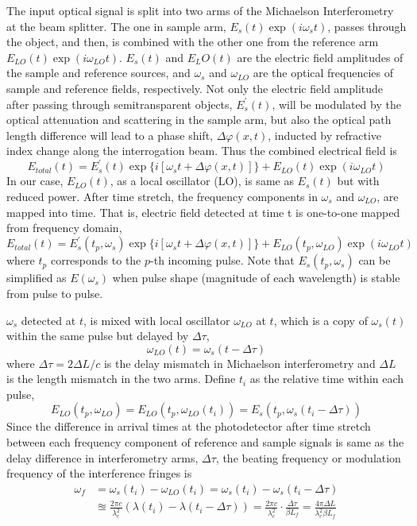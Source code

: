 \documentclass[aps,pra,reprint,superscriptaddress]{revtex4-1}
\begin{document}
The input optical signal is split into two arms of the Michaelson Interferometry at the beam splitter. The one in sample arm, $E_s(t)\exp⁡(i\omega_s t)$, passes through the object, and then, is combined with the other one from the reference arm $E_{LO}(t)\exp⁡(i\omega_{LO} t)$. $E_s(t)$ and $E_LO(t)$ are the electric field amplitudes of the sample and reference sources, and $\omega_s$ and $\omega_{LO}$ are the optical frequencies of sample and reference fields, respectively. Not only the electric field amplitude after passing through semitransparent objects, $E_s^\prime(t)$, will be modulated by the optical attenuation and scattering in the sample arm, but also the optical path length difference will lead to a phase shift, $\Delta\varphi(x,t)$, inducted by refractive index change along the interrogation beam. Thus the combined electrical field is
\begin{equation}
E_{total}(t) = E_s^\prime(t) \exp⁡ \lbrace i[\omega_s t+\Delta\varphi(x,t)] \rbrace + E_{LO}(t) \exp⁡(i\omega_{LO} t)
\end{equation}
In our case, $E_{LO}(t)$, as a local oscillator (LO), is same as $E_s(t)$ but with reduced power. After time stretch, the frequency components in $\omega_s$ and $\omega_{LO}$, are mapped into time. That is, electric field detected at time t is one-to-one mapped from frequency domain,
\begin{equation}
E_{total}(t) = E_s^\prime(t_p,\omega_s) \exp ⁡\lbrace i[\omega_s t+\Delta\varphi(x,t)] \rbrace + E_{LO}(t_p,\omega_{LO}) \exp⁡(i\omega_{LO} t)
\end{equation}
where $t_p$ corresponds to the $p$-th incoming pulse. Note that $E_s(t_p,\omega_s)$ can be simplified as $E(\omega_s)$ when pulse shape (magnitude of each wavelength) is stable from pulse to pulse.

$\omega_s$ detected at $t$, is mixed with local oscillator $\omega_{LO}$ at $t$, which is a copy of $\omega_s(t)$ within the same pulse but delayed by $\Delta\tau$,
\begin{equation}
\omega_{LO}(t) = \omega_s(t-\Delta\tau)
\end{equation}
where $\Delta\tau = 2 \Delta L/c$ is the delay mismatch in Michaelson interferometry and $\Delta L$ is the length mismatch in the two arms. Define $t_i$ as the relative time within each pulse,
\begin{equation}
E_{LO}(t_p,\omega_{LO}) = E_{LO}(t_p,\omega_{LO}(t_i)) = E_s(t_p,\omega_s(t_i-\Delta\tau))
\end{equation}
Since the difference in arrival times at the photodetector after time stretch between each frequency component of reference and sample signals is same as the delay difference in interferometry arms, $\Delta\tau$, the beating frequency or modulation frequency of the interference fringes is
\begin{align*}
\omega_f& = \omega_s(t_i ) - \omega_{LO}(t_i ) = \omega_s(t_i ) - \omega_s(t_i-\Delta\tau)\\& \approxeq \frac{2\pi c}{\lambda_c^2} (\lambda(t_i) - \lambda(t_i-\Delta\tau)) = \frac{2\pi c}{\lambda_c^2} \cdot \frac{\Delta\tau}{\beta L_f} = \frac{4\pi\Delta L}{\lambda_c^2 \beta L_f}
\end{align*}
\end{document}
